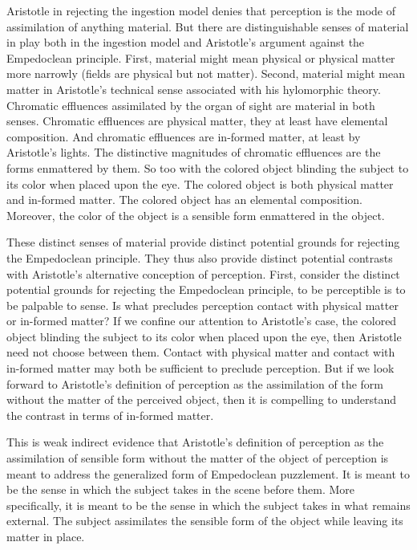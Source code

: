 Aristotle in rejecting the ingestion model denies that perception is the mode of assimilation of anything material. But there are distinguishable senses of material in play both in the ingestion model and Aristotle's argument against the Empedoclean principle. First, material might mean physical or physical matter more narrowly (fields are physical but not matter). Second, material might mean matter in Aristotle's technical sense associated with his hylomorphic theory. Chromatic effluences assimilated by the organ of sight are material in both senses. Chromatic effluences are physical matter, they at least have elemental composition. And chromatic effluences are in-formed matter, at least by Aristotle's lights. The distinctive magnitudes of chromatic effluences are the forms enmattered by them. So too with the colored object blinding the subject to its color when placed upon the eye. The colored object is both physical matter and in-formed matter. The colored object has an elemental composition. Moreover, the color of the object is a sensible form enmattered in the object.

These distinct senses of material provide distinct potential grounds for rejecting the Empedoclean principle. They thus also provide distinct potential contrasts with Aristotle's alternative conception of perception. First, consider the distinct potential grounds for rejecting the Empedoclean principle, to be perceptible is to be palpable to sense. Is what precludes perception contact with physical matter or in-formed matter? If we confine our attention to Aristotle's case, the colored object blinding the subject to its color when placed upon the eye, then Aristotle need not choose between them. Contact with physical matter and contact with in-formed matter may both be sufficient to preclude perception. But if we look forward to Aristotle's definition of perception as the assimilation of the form without the matter of the perceived object, then it is compelling to understand the contrast in terms of in-formed matter. 

This is weak indirect evidence that Aristotle's definition of perception as the assimilation of sensible form without the matter of the object of perception is meant to address the generalized form of Empedoclean puzzlement. It is meant to be the sense in which the subject takes in the scene before them. More specifically, it is meant to be the sense in which the subject takes in what remains external. The subject assimilates the sensible form of the object while leaving its matter in place. 




